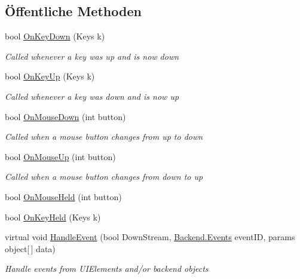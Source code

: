 \subsection*{Öffentliche Methoden}
\begin{DoxyCompactItemize}
\item 
bool \hyperlink{class_gruppe22_1_1_client_1_1_game_win_aba7e900502db9021072b1c85ec2f249a}{On\-Key\-Down} (Keys k)
\begin{DoxyCompactList}\small\item\em Called whenever a key was up and is now down \end{DoxyCompactList}\item 
bool \hyperlink{class_gruppe22_1_1_client_1_1_game_win_a9bab3243c9a2b2aaf135f0da6eac7ea3}{On\-Key\-Up} (Keys k)
\begin{DoxyCompactList}\small\item\em Called whenever a key was down and is now up \end{DoxyCompactList}\item 
bool \hyperlink{class_gruppe22_1_1_client_1_1_game_win_a62daf14bfc3ec358727ba46e12fa7167}{On\-Mouse\-Down} (int button)
\begin{DoxyCompactList}\small\item\em Called when a mouse button changes from up to down \end{DoxyCompactList}\item 
bool \hyperlink{class_gruppe22_1_1_client_1_1_game_win_a4adfd580aed6944cd2b286d3c6e768b9}{On\-Mouse\-Up} (int button)
\begin{DoxyCompactList}\small\item\em Called when a mouse button changes from down to up \end{DoxyCompactList}\item 
bool \hyperlink{class_gruppe22_1_1_client_1_1_game_win_ad9f9d99d868de3f6e7446524074856c9}{On\-Mouse\-Held} (int button)
\item 
bool \hyperlink{class_gruppe22_1_1_client_1_1_game_win_a9a74789da3ac1c1fa9ac35541db76c6d}{On\-Key\-Held} (Keys k)
\item 
virtual void \hyperlink{class_gruppe22_1_1_client_1_1_game_win_a47112e8228877ffb715cef2ec4e7ad21}{Handle\-Event} (bool Down\-Stream, \hyperlink{namespace_gruppe22_1_1_backend_ab56df91bb0bdafa1ea978e552209ce73}{Backend.\-Events} event\-I\-D, params object\mbox{[}$\,$\mbox{]} data)
\begin{DoxyCompactList}\small\item\em Handle events from U\-I\-Elements and/or backend objects \end{DoxyCompactList}\item 

\end{DoxyCompactItemize}
